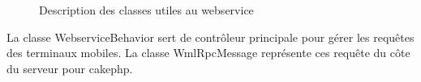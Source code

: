 \begin{figure}[H]
	\begin{center}\end{center}
	\caption{Description des classes utiles au webservice}
\end{figure}

La classe WebserviceBehavior sert de contrôleur principale pour gérer les requêtes des terminaux mobiles. La classe WmlRpcMessage représente ces requête du côte du serveur pour cakephp.
